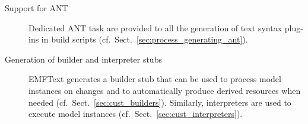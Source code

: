 \begin{description}

  \item[Support for ANT]
        Dedicated ANT task are provided to all the generation of text syntax 
        plug-ins in build scripts (cf.~Sect.~\ref{sec:process_generating_ant}).

  \item[Generation of builder and interpreter stubs]
        EMFText generates a builder stub that can be used to process 
        model instances on changes and to automatically produce derived 
        resources when needed (cf.~Sect.~\ref{sec:cust_builders}). 
        Similarly, interpreters are used to execute model instances 
        (cf.~Sect.~\ref{sec:cust_interpreters}).
        
\end{description}